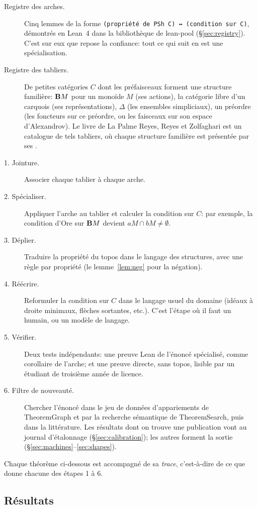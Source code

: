\begin{description}
\item[Registre des arches.] Cinq lemmes de la forme \texttt{(propriété de PSh C) ↔ (condition sur C)}, démontrés en Lean~4 dans la bibliothèque \lp{} de lean-pool (\S\ref{sec:registry}). C'est sur eux que repose la confiance: tout ce qui suit en est une spécialisation.
\item[Registre des tabliers.] De petites catégories $C$ dont les préfaisceaux forment une structure familière: $\mathbf{B} M$ pour un monoïde $M$ (ses actions), la catégorie libre d'un carquois (ses représentations), $\Delta$ (les ensembles simpliciaux), un préordre (les foncteurs sur ce préordre, ou les faisceaux sur son espace d'Alexandrov). Le livre de La Palme Reyes, Reyes et Zolfaghari \cite{reyes-generic} est un catalogue de tels tabliers, où chaque structure familière est présentée par ses .
\item[1. Jointure.] Associer chaque tablier à chaque arche.
\item[2. Spécialiser.] Appliquer l'arche au tablier et calculer la condition sur $C$: par exemple, la condition d'Ore sur $\mathbf{B} M$ devient $aM\cap bM\neq\emptyset$.
\item[3. Déplier.] Traduire la propriété du topos dans le langage des structures, avec une règle par propriété (le lemme~\ref{lem:neg} pour la négation).
\item[4. Réécrire.] Reformuler la condition sur $C$ dans le langage usuel du domaine (idéaux à droite minimaux, flèches sortantes, etc.). C'est l'étape où il faut un humain, ou un modèle de langage.
\item[5. Vérifier.] Deux tests indépendants: une preuve Lean de l'énoncé spécialisé, comme corollaire de l'arche; et une preuve directe, sans topos, lisible par un étudiant de troisième année de licence.
\item[6. Filtre de nouveauté.] Chercher l'énoncé dans le jeu de données d'appariements de TheoremGraph et par la recherche sémantique de TheoremSearch, puis dans la littérature. Les résultats dont on trouve une publication vont au journal d'étalonnage (\S\ref{sec:calibration}); les autres forment la sortie (\S\ref{sec:machines}--\ref{sec:shapes}).
\end{description}

Chaque théorème ci-dessous est accompagné de sa \emph{trace}, c'est-à-dire de ce que donne chacune des étapes 1 à 6.

\subsection{Résultats}

